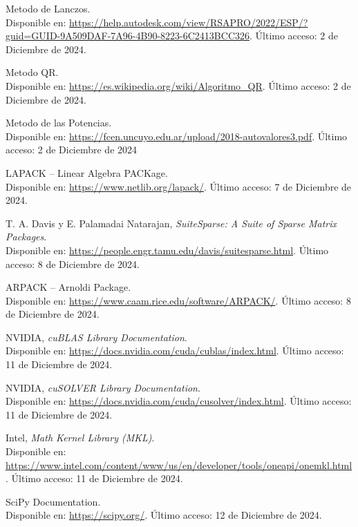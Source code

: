 \documentclass{article}
\begin{document}
\newpage
\begin{thebibliography}{9}

Metodo de Lanczos.\\
Disponible en: \url{https://help.autodesk.com/view/RSAPRO/2022/ESP/?guid=GUID-9A509DAF-7A96-4B90-8223-6C2413BCC326}.  
Último acceso: 2 de Diciembre de 2024.

Metodo QR.\\
Disponible en: \url{https://es.wikipedia.org/wiki/Algoritmo_QR}.  
Último acceso: 2 de Diciembre de 2024.

Metodo de las Potencias.\\
Disponible en: \url{https://fcen.uncuyo.edu.ar/upload/2018-autovalores3.pdf}.  
Último acceso: 2 de Diciembre de 2024

LAPACK – Linear Algebra PACKage.  \\
Disponible en: \url{https://www.netlib.org/lapack/}.  
Último acceso: 7 de Diciembre de 2024.

T. A. Davis y E. Palamadai Natarajan, \emph{SuiteSparse: A Suite of Sparse Matrix Packages}. \\ 
Disponible en: \url{https://people.engr.tamu.edu/davis/suitesparse.html}.  
Último acceso: 8 de Diciembre de 2024.

ARPACK – Arnoldi Package.  \\
Disponible en: \url{https://www.caam.rice.edu/software/ARPACK/}.  
Último acceso: 8 de Diciembre de 2024.

NVIDIA, \emph{cuBLAS Library Documentation}.\\  
Disponible en: \url{https://docs.nvidia.com/cuda/cublas/index.html}.  
Último acceso: 11 de Diciembre de 2024.

NVIDIA, \emph{cuSOLVER Library Documentation}.  \\
Disponible en: \url{https://docs.nvidia.com/cuda/cusolver/index.html}.  
Último acceso: 11 de Diciembre de 2024.

Intel, \emph{Math Kernel Library (MKL)}.  \\
Disponible en: \url{https://www.intel.com/content/www/us/en/developer/tools/oneapi/onemkl.html}.  
Último acceso: 11 de Diciembre de 2024.

SciPy Documentation.  \\
Disponible en: \url{https://scipy.org/}.  
Último acceso: 12 de Diciembre de 2024.


\end{thebibliography}
\end{document}
